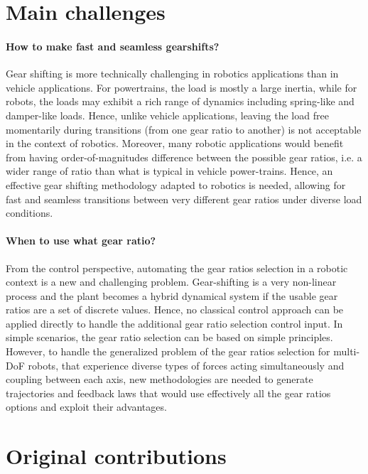 \newpage

\section{Main challenges}
\label{sec:MainChallenges}

\paragraph{How to make fast and seamless gearshifts?}
Gear shifting is more technically challenging in robotics applications than in vehicle applications. For powertrains, the load is mostly a large inertia, while for robots, the loads may exhibit a rich range of dynamics including spring-like and damper-like loads. Hence, unlike vehicle applications, leaving the load free momentarily during transitions (from one gear ratio to another) is not acceptable in the context of robotics. Moreover, many robotic applications would benefit from having order-of-magnitudes difference between the possible gear ratios, i.e. a wider range of ratio than what is typical in vehicle power-trains. Hence, an effective gear shifting methodology adapted to robotics is needed, allowing for fast and seamless transitions between very different gear ratios under diverse load conditions.

\paragraph{When to use what gear ratio?}
From the control perspective, automating the gear ratios selection in a robotic context is a new and challenging problem. Gear-shifting is a very non-linear process and the plant becomes a hybrid dynamical system if the usable gear ratios are a set of discrete values. Hence, no classical control approach can be applied directly to handle the additional gear ratio selection control input. In simple scenarios, the gear ratio selection can be based on simple principles. However, to handle the generalized problem of the gear ratios selection for multi-DoF robots, that experience diverse types of forces acting simultaneously and coupling between each axis, new methodologies are needed to generate trajectories and feedback laws that would use effectively all the gear ratios options and exploit their advantages.


\newpage

\section{Original contributions}
\label{sec:contribution}

